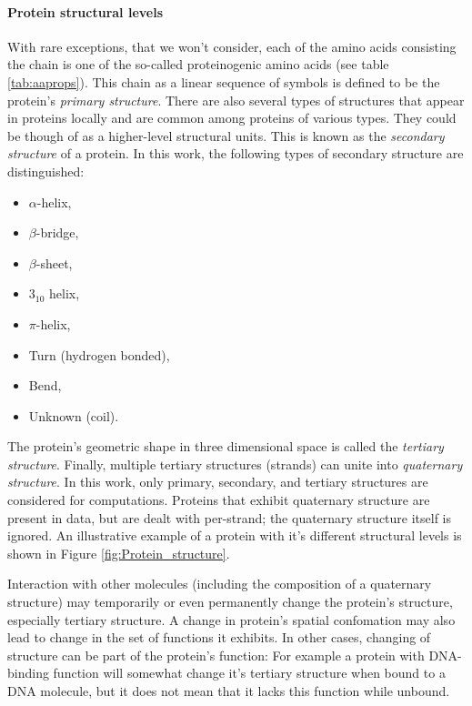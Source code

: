 \documentclass[11pt,twoside,a4paper]{book}
\begin{document}
\paragraph{Protein structural levels} With rare exceptions, that we won't consider,
each of the amino acids consisting the chain is one of the
so-called proteinogenic amino acids (see table \ref{tab:aaprops}). 
This chain as a linear sequence of symbols is defined to be the protein's \emph{primary structure}.
There are also several types of structures that appear in proteins locally and are common among
proteins of various types.
They could be though of as a higher-level structural units. This is known as the \emph{secondary structure}
of a protein. In this work, the following types of secondary structure are distinguished:
\begin{itemize}
 \item $\alpha$-helix,
 \item $\beta$-bridge,
 \item $\beta$-sheet,
 \item $3_{10}$ helix,
 \item $\pi$-helix,
 \item Turn (hydrogen bonded),
 \item Bend,
 \item Unknown (coil).
\end{itemize}
The protein's geometric shape in three dimensional space is called the \emph{tertiary structure}. 
Finally, multiple tertiary structures (strands) can unite into \emph{quaternary structure}.
In this work, only primary, secondary, and tertiary structures are considered for computations.
Proteins that exhibit quaternary structure are present in data, but are dealt with per-strand; 
the quaternary structure itself is ignored.
An illustrative example of a protein with it's different structural levels 
is shown in Figure \ref{fig:Protein_structure}.

Interaction with other molecules (including the composition of a quaternary structure)
may temporarily or even permanently change the protein's structure,
especially tertiary structure.
A change in protein's spatial confomation may also lead to change in the set of functions
it exhibits. 
In other cases, changing of structure can be part of the protein's function:
For example a protein with DNA-binding function will somewhat change it's tertiary
structure when bound to a DNA molecule, but it does not mean that it lacks this
function while unbound.
\end{document}
